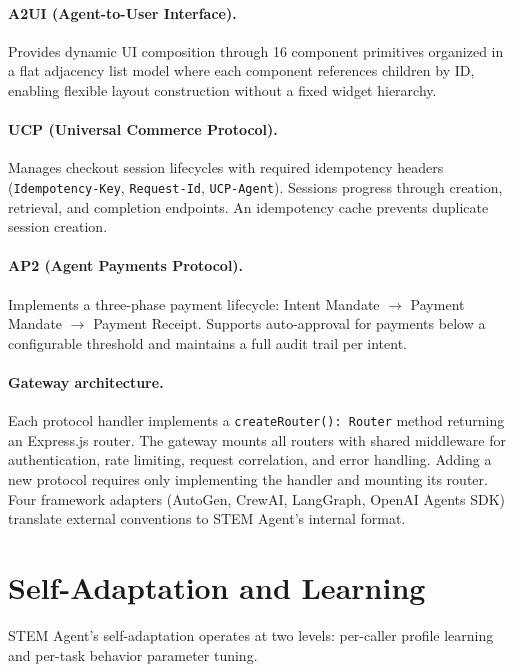 \documentclass{article}
\begin{document}
\paragraph{A2UI (Agent-to-User Interface).} Provides dynamic UI composition through 16 component primitives organized in a flat adjacency list model where each component references children by ID, enabling flexible layout construction without a fixed widget hierarchy.

\paragraph{UCP (Universal Commerce Protocol).} Manages checkout session lifecycles with required idempotency headers (\texttt{Idempotency-Key}, \texttt{Request-Id}, \texttt{UCP-Agent}). Sessions progress through creation, retrieval, and completion endpoints. An idempotency cache prevents duplicate session creation.

\paragraph{AP2 (Agent Payments Protocol).} Implements a three-phase payment lifecycle: Intent Mandate $\rightarrow$ Payment Mandate $\rightarrow$ Payment Receipt. Supports auto-approval for payments below a configurable threshold and maintains a full audit trail per intent.

\paragraph{Gateway architecture.} Each protocol handler implements a \texttt{createRouter(): Router} method returning an Express.js router. The gateway mounts all routers with shared middleware for authentication, rate limiting, request correlation, and error handling. Adding a new protocol requires only implementing the handler and mounting its router. Four framework adapters (AutoGen, CrewAI, LangGraph, OpenAI Agents SDK) translate external conventions to STEM Agent's internal format.

\section{Self-Adaptation and Learning}
\label{sec:adaptation}

STEM Agent's self-adaptation operates at two levels: per-caller profile learning and per-task behavior parameter tuning.
\end{document}
